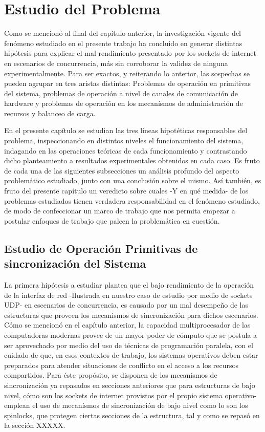 \chapter{Estudio del Problema}

Como se mencionó al final del capítulo anterior, la investigación vigente del fenómeno estudiado en el presente trabajo ha concluido en generar distintas hipótesis para explicar el mal rendimiento presentado por los sockets de internet en escenarios de concurrencia, más sin corroborar la validez de ninguna experimentalmente. Para ser exactos, y reiterando lo anterior, las sospechas se pueden agrupar en tres aristas distintas: Problemas de operación en primitivas del sistema, problemas de operación a nivel de canales de comunicación de hardware y problemas de operación en los mecanísmos de administración de recursos y balanceo de carga.

En el presente capítulo se estudian las tres líneas hipotéticas responsables del problema, inspeccionando en distintos niveles el funcionamiento del sistema, indagando en las operaciones teóricas de cada funcionamiento y contrastando dicho planteamiento a resultados experimentales obtenidos en cada caso. Es fruto de cada una de las siguientes subsecciones un análisis profundo del aspecto problemático estudiado, junto con una conclusión sobre el mismo. Así también, es fruto del presente capítulo un veredicto sobre cuales -Y en qué medida- de los problemas estudiados tienen verdadera responsabilidad en el fenómeno estudiado, de modo de confeccionar un marco de trabajo que nos permita empezar a postular enfoques de trabajo que paleen la problemática en cuestión.

\section{Estudio de Operación Primitivas de sincronización del Sistema}

La primera hipótesis a estudiar plantea que el bajo rendimiento de la operación de la interfaz de red -Ilustrada en nuestro caso de estudio por medio de sockets UDP- en escenarios de concurrencia, es causado por un mal desempeño de las estructuras que proveen los mecanismos de sincronización para dichos escenarios. Cómo se mencionó en el capítulo anterior, la capacidad multiprocesador de las computadoras modernas provee de un mayor poder de cómputo que se postula a ser aprovechado por medio del uso de técnicas de programación paralela, con el cuidado de que, en esos contextos de trabajo, los sistemas operativos deben estar preparados para atender situaciones de conflicto en el acceso a los recursos compartidos. Para éste propósito, se disponen de los mecanísmos de sincronización ya repasados en secciones anteriores que para estructuras de bajo nivel, cómo son los sockets de internet provistos por el propio sistema operativo- emplean el uso de mecanísmos de sincronización de bajo nivel como lo son los spinlocks, que protegen ciertas secciones de la estructura, tal y como se repasó en la sección XXXXX.

